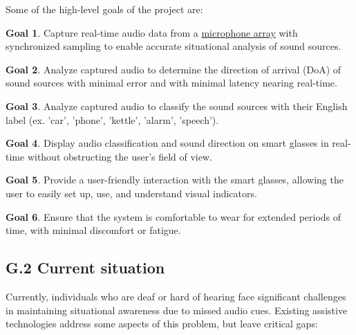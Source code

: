 \documentclass[12pt]{article}
\theoremstyle{definition}
\newtheorem{goal}{Goal}
\begin{document}
Some of the high-level goals of the project are:

\begin{goal}\label{goal:audio_capture} Capture real-time audio data from a 
\hyperref[def:microphone_array]{microphone array}
with synchronized sampling to enable accurate situational analysis of sound
sources.
\end{goal}

\begin{goal}\label{goal:audio_direction_analysis} Analyze captured audio to
determine the direction of arrival (DoA) of sound sources with minimal error and
with minimal latency nearing real-time.
\end{goal}

\begin{goal}\label{goal:audio_identification_analysis} Analyze captured audio to
classify the sound sources with their English label (ex. 'car', 'phone',
'kettle', 'alarm', 'speech').
\end{goal}

\begin{goal}\label{goal:visual_display} Display audio classification and sound
direction on smart glasses in real-time without obstructing the user's field of
view.
\end{goal}

\begin{goal}\label{goal:user_friendly_interaction} Provide a user-friendly
interaction with the smart glasses, allowing the user to easily set up, use, and
understand visual indicators.
\end{goal}

\begin{goal}\label{goal:user_comfort} Ensure that the system is comfortable to
wear for extended periods of time, with minimal discomfort or fatigue.
\end{goal}
    
\subsection{G.2 Current situation}

Currently, individuals who are deaf or hard of hearing face significant
challenges in maintaining situational awareness due to missed audio cues.
Existing assistive technologies address some aspects of this problem, but leave
critical gaps:
\end{document}
